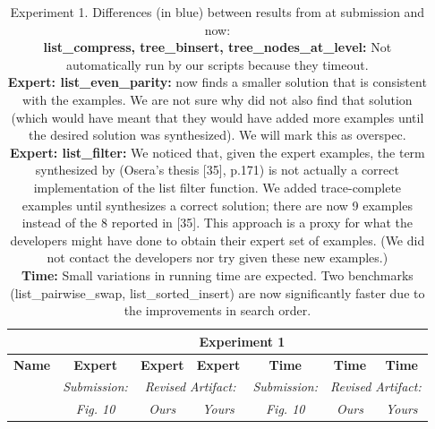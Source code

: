 \begin{table}

\experimentTableSize

\begin{tabular}{l|cccccc}
& \multicolumn{6}{c}{\textbf{Experiment 1}} \\\hline
\textbf{Name} &
\textbf{Expert} & \textbf{Expert} & \textbf{Expert} &
\textbf{Time} & \textbf{Time} & \textbf{Time} \\
&
\textit{Submission:} & \multicolumn{2}{c}{\textit{Revised Artifact:}} &
\textit{Submission:} & \multicolumn{2}{c}{\textit{Revised Artifact:}} \\
&
\textit{Fig. 10} & \textit{Ours} & \textit{Yours} &
\textit{Fig. 10} & \textit{Ours} & \textit{Yours} \\

\end{tabular}

\vspace{0.10in}

\caption{Experiment 1.
%
Differences (in blue) between results from \snsMyth{} at submission and
\snsMyth{} now:
%
\experimentCaptionSize
%
\\[3pt]
%
\textbf{list\_compress, tree\_binsert, tree\_nodes\_at\_level:} Not
automatically run by our scripts because they {\scriptsize{timeout}}.
%
\\[3pt]
%
\textbf{Expert: list\_even\_parity:} \snsMyth{} now finds a smaller solution
that is consistent with the \myth{} examples. We are not sure why \myth{} did
not also find that solution (which would have meant that they would have added
more examples until the desired solution was synthesized). We will mark this as
{\scriptsize{overspec}}.
%
\\[3pt]
%
\textbf{Expert: list\_filter:} We noticed that, given the \myth{} expert
examples, the term synthesized by \myth{} (Osera's thesis [35], p.171) is not
actually a correct implementation of the list filter function. We added
trace-complete examples until \snsMyth{} synthesizes a correct solution; there
are now 9 examples instead of the 8 reported in [35]. This approach is a proxy
for what the \myth{} developers might have done to obtain their expert set of
examples. (We did not contact the \myth{} developers nor try \myth{} given these
new examples.)
%
\\[3pt]
%
\textbf{Time:} Small variations in running time are expected. Two benchmarks
(list\_pairwise\_swap, list\_sorted\_insert) are now significantly faster due to
the improvements in search order.
%
}

\end{table}
